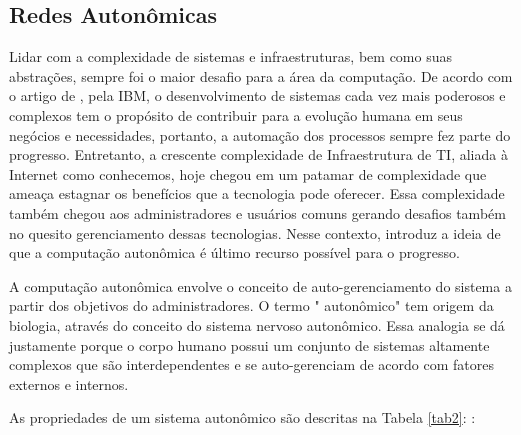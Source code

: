\subsection{Redes Autonômicas}

Lidar com a complexidade de sistemas e infraestruturas, bem como suas abstrações, sempre foi o maior desafio para a área da computação. De acordo com o artigo de , pela IBM, o desenvolvimento de sistemas cada vez mais poderosos e complexos  tem o propósito de contribuir para a evolução humana em seus negócios e necessidades, portanto, a automação dos processos sempre fez parte do progresso. Entretanto, a crescente complexidade de Infraestrutura de TI, aliada à Internet como conhecemos, hoje chegou em um patamar de complexidade que ameaça estagnar os benefícios que a tecnologia pode oferecer. Essa complexidade também chegou aos administradores e usuários comuns gerando desafios também no quesito gerenciamento dessas tecnologias. Nesse contexto,  introduz a ideia de que a computação autonômica é último recurso possível para o progresso.
\par  A computação autonômica envolve o conceito de auto-gerenciamento do sistema a partir dos objetivos do administradores. O termo " autonômico" tem origem da biologia, através do conceito do sistema nervoso autonômico. Essa analogia se dá justamente porque o corpo humano possui um conjunto de sistemas altamente complexos que são interdependentes e se auto-gerenciam de acordo com fatores externos e internos.
\par As propriedades de um sistema autonômico são descritas na Tabela \ref{tab2}: \cite{RFC7575}:

